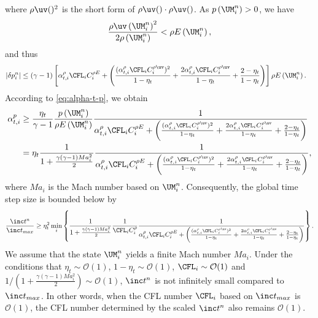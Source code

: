 where $\rho\uv()^2$ is the short form of $\rho\uv()\cdot\rho\uv()$.
As $p\left(\UM^n_i\right) > 0$, we have
\begin{equation}
    \frac{ \rho\uv\left(\UM^n_i\right)^2}{2\rho\left(\UM^n_i\right)} < \rho E\left(\UM^n_i\right),
\end{equation}
and thus
\begin{equation}
    \begin{aligned}
        |\delta p_i^n| &\leq
        (\gamma-1)\left[
         \alpha_{t,i}^\rho\CFL_i C^{\rho E}_i  
        +\left(
        \frac{(\alpha_{t,i}^\rho\CFL_i C^{\rho \uv}_i)^2}{1-\eta_t}
        +\frac{2\alpha_{t,i}^\rho\CFL_i C^{\rho \uv}_i}{1-\eta_t}
        + \frac{2-\eta_t}{1-\eta_t}
        \right)
        \right]
        \rho E\left( \UM^n_i \right).
    \end{aligned}
\end{equation}
According to \eqref{eq:alpha-t-p}, we obtain
\begin{equation}
    \begin{aligned}
        \label{eq:alpha-t-p-lb}
        \alpha_{t,i}^{p} 
        & \geq \dfrac{\eta_t}{\gamma-1} \frac{p\left(\UM^n_i\right)}{
            \rho E\left(\UM^n_i\right)
        }
        \frac{1}{
         \alpha_{t,i}^\rho\CFL_i C^{\rho E}_i  
            +\left(
            \frac{(\alpha_{t,i}^\rho\CFL_i C^{\rho \uv}_i)^2}{1-\eta_t}
            +\frac{2\alpha_{t,i}^\rho\CFL_i C^{\rho \uv}_i}{1-\eta_t}
            + \frac{2-\eta_t}{1-\eta_t}
            \right)
        } \\
        & = \eta_t \frac{1}{
           1 + \frac{\gamma (\gamma-1) Ma_i^2}{2}
        }
        \frac{1}{
         \alpha_{t,i}^\rho\CFL_i C^{\rho E}_i  
            +\left(
            \frac{(\alpha_{t,i}^\rho\CFL_i C^{\rho \uv}_i)^2}{1-\eta_t}
            +\frac{2\alpha_{t,i}^\rho\CFL_i C^{\rho \uv}_i}{1-\eta_t}
            + \frac{2-\eta_t}{1-\eta_t}
            \right)
        },
    \end{aligned}
\end{equation}
where $Ma_i$ is the Mach number based on $\UM^n_i$. 
Consequently, the global time step size is bounded below by
\begin{equation}
    \label{eq:delta-t-lb}
    \frac{\inc t^n}{\inc t_{max}} \geq 
    \eta_t^2
    \min_i
    \left\{
    \frac{1}{
           1 + \frac{\gamma (\gamma-1) Ma_i^2}{2}
        }
    \frac{1}{\CFL_i C_i^\rho}
    \frac{1}{
     \alpha_{t,i}^\rho\CFL_i C^{\rho E}_i  
        +\left(
        \frac{(\alpha_{t,i}^\rho\CFL_i C^{\rho \uv}_i)^2}{1-\eta_t}
        +\frac{2\alpha_{t,i}^\rho\CFL_i C^{\rho \uv}_i}{1-\eta_t}
        + \frac{2-\eta_t}{1-\eta_t}
        \right)
    }
    \right\}.
\end{equation}
We assume that the state $\UM^n_i$ yields a finite Mach number $Ma_i$.
Under the conditions that $\eta_t\sim\mathcal{O}(1)$, $1-\eta_t\sim\mathcal{O}(1)$,
$\CFL_i\sim\mathcal{O}(1)$ and ${1}/\left(1 + \frac{\gamma (\gamma-1) Ma_i^2}{2}\right)\sim\mathcal{O}(1)$,
$\inc t^n$ is not infinitely small compared to $\inc t_{max}$.
In other words, when the CFL number $\CFL_i$ based on $\inc t_{max}$ is $\mathcal{O}(1)$, 
the CFL number determined by the scaled $\inc t^n$ also remains $\mathcal{O}(1)$.
